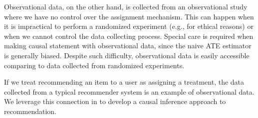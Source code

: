 Observational data, on the other hand, is collected from an observational study where we have no control over the assignment mechanism. This can happen when it is impractical to perform a randomized experiment (e.g., for ethical reasons) or when we cannot control the data collecting process. Special care is required when making causal statement with observational data, since the naive \gls{ATE} estimator is generally biased. Despite such difficulty, observational data is easily accessible comparing to data collected from randomized experiments.

If we treat recommending an item to a user as assigning a treatment, the data collected from a typical recommender system is an example of observational data. We leverage this connection in  to develop a causal inference approach to recommendation. 





